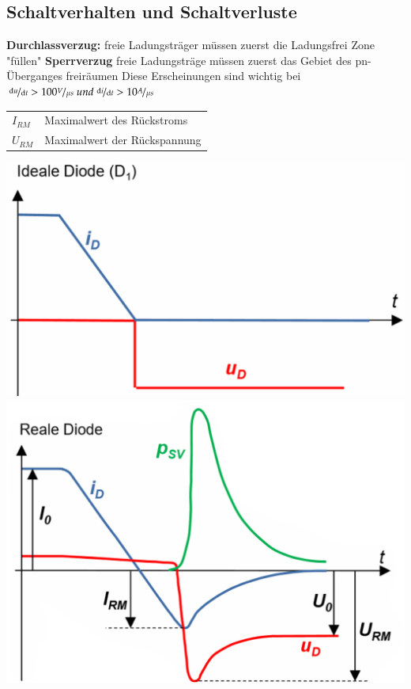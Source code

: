 \subsection{Schaltverhalten und Schaltverluste}
    \begin{minipage}{0.7\linewidth}
        \raggedright
        \textbf{Durchlassverzug:}\newline
        freie Ladungsträger müssen zuerst die Ladungsfrei Zone "füllen"\newline\newline
        \textbf{Sperrverzug}\newline
        freie Ladungsträge müssen zuerst das Gebiet des pn-Überganges freiräumen\newline\newline
        Diese Erscheinungen sind wichtig bei  $\nicefrac{\mathop{}\!\mathrm{d} u}{\mathop{}\!\mathrm{d} t} > 100 \nicefrac{V}{\mu s} \; und \; \nicefrac{\mathop{}\!\mathrm{d} i}{\mathop{}\!\mathrm{d} t} > 10 \nicefrac{A}{\mu s} $
        \begin{tabular}{ll}
            $ I_{RM} $&Maximalwert des Rückstroms\\
            $ U_{RM} $&Maximalwert der Rückspannung\\
        \end{tabular}
    \end{minipage}   
    \begin{minipage}{0.3\linewidth}
        \vspace{-0.8cm}
        \raggedleft
            \includegraphics[width=\linewidth]{images/idealeDiodeSS}           
            \includegraphics[width=\linewidth]{images/realeDiodeSS}
    \end{minipage}
\clearpage